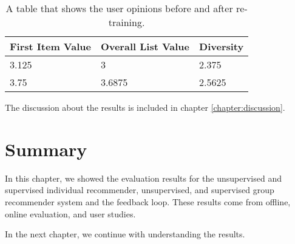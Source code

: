 \begin{table}[htp]
	\caption[Online Evaluation Table]{A table that shows the user opinions before and after re-training.}\label{tab:online-evaluation}
	\centering
	\begin{tabular}{l l l}
		\toprule
		First Item Value & Overall List Value & Diversity \\
		\midrule
		3.125 & 3 & 2.375\\
		3.75 & 3.6875 & 2.5625 \\
		\bottomrule
	\end{tabular}
\end{table}

The discussion about the results is included in chapter \ref{chapter:discussion}.

\section{Summary}

In this chapter, we showed the evaluation results for the unsupervised and supervised individual recommender, unsupervised, and supervised group recommender system and the feedback loop. These results come from offline, online evaluation, and user studies. 

In the next chapter, we continue with understanding the results.

